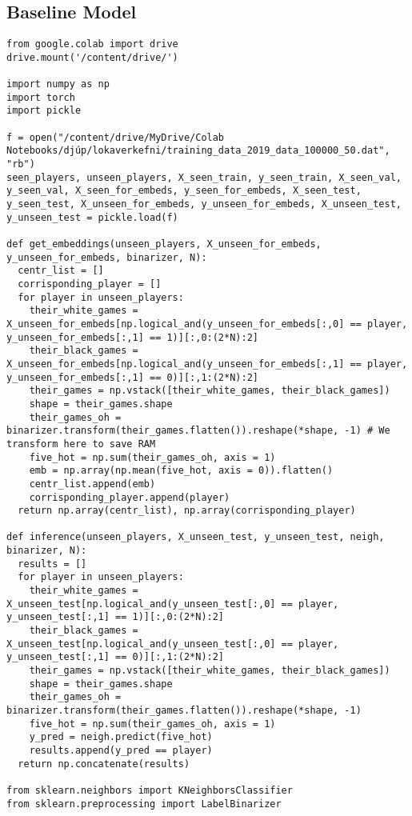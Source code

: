 \subsection{Baseline Model}
\begin{verbatim}
from google.colab import drive
drive.mount('/content/drive/')

import numpy as np
import torch
import pickle

f = open("/content/drive/MyDrive/Colab Notebooks/djúp/lokaverkefni/training_data_2019_data_100000_50.dat", "rb")
seen_players, unseen_players, X_seen_train, y_seen_train, X_seen_val, y_seen_val, X_seen_for_embeds, y_seen_for_embeds, X_seen_test, y_seen_test, X_unseen_for_embeds, y_unseen_for_embeds, X_unseen_test, y_unseen_test = pickle.load(f)

def get_embeddings(unseen_players, X_unseen_for_embeds, y_unseen_for_embeds, binarizer, N):
  centr_list = []
  corrisponding_player = []
  for player in unseen_players:
    their_white_games = X_unseen_for_embeds[np.logical_and(y_unseen_for_embeds[:,0] == player, y_unseen_for_embeds[:,1] == 1)][:,0:(2*N):2]
    their_black_games = X_unseen_for_embeds[np.logical_and(y_unseen_for_embeds[:,1] == player, y_unseen_for_embeds[:,1] == 0)][:,1:(2*N):2]
    their_games = np.vstack([their_white_games, their_black_games])
    shape = their_games.shape
    their_games_oh = binarizer.transform(their_games.flatten()).reshape(*shape, -1) # We transform here to save RAM
    five_hot = np.sum(their_games_oh, axis = 1)
    emb = np.array(np.mean(five_hot, axis = 0)).flatten()
    centr_list.append(emb)
    corrisponding_player.append(player)
  return np.array(centr_list), np.array(corrisponding_player)

def inference(unseen_players, X_unseen_test, y_unseen_test, neigh, binarizer, N):
  results = []
  for player in unseen_players:
    their_white_games = X_unseen_test[np.logical_and(y_unseen_test[:,0] == player, y_unseen_test[:,1] == 1)][:,0:(2*N):2]
    their_black_games = X_unseen_test[np.logical_and(y_unseen_test[:,0] == player, y_unseen_test[:,1] == 0)][:,1:(2*N):2]
    their_games = np.vstack([their_white_games, their_black_games])
    shape = their_games.shape
    their_games_oh = binarizer.transform(their_games.flatten()).reshape(*shape, -1)
    five_hot = np.sum(their_games_oh, axis = 1)
    y_pred = neigh.predict(five_hot)
    results.append(y_pred == player)
  return np.concatenate(results)

from sklearn.neighbors import KNeighborsClassifier
from sklearn.preprocessing import LabelBinarizer


\end{verbatim}
